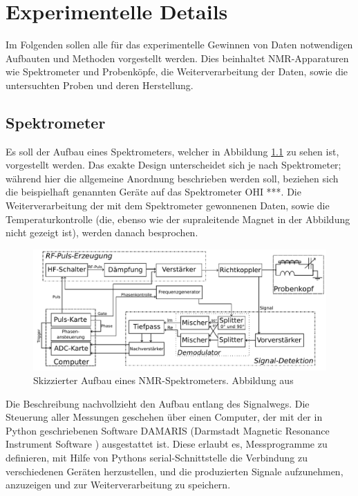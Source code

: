 \chapter{Experimentelle Details} \label{chapter:exp_details}

Im Folgenden sollen alle für das experimentelle Gewinnen von Daten notwendigen Aufbauten und Methoden vorgestellt werden. Dies beinhaltet NMR-Apparaturen wie Spektrometer und Probenköpfe, die Weiterverarbeitung der Daten, sowie die untersuchten Proben und deren Herstellung.

\section{Spektrometer} \label{section:exp:spektrometer}

Es soll der Aufbau eines Spektrometers, welcher in Abbildung \ref{fig:exp:aufbau} zu sehen ist, vorgestellt werden. Das exakte Design unterscheidet sich je nach Spektrometer; während hier die allgemeine Anordnung beschrieben werden soll, beziehen sich die beispielhaft genannten Geräte auf das Spektrometer OHI ***. Die Weiterverarbeitung der mit dem Spektrometer gewonnenen Daten, sowie die Temperaturkontrolle (die, ebenso wie der supraleitende Magnet in der Abbildung nicht gezeigt ist), werden danach besprochen.

\begin{figure}
	\begin{center}
		\includegraphics[width=\textwidth]{graphics/joachim/aufbau.pdf} 
	\end{center}
	\caption{Skizzierter Aufbau eines NMR-Spektrometers. Abbildung aus \cite[S. 29]{lueg_implementierung_2016}} \label{fig:exp:aufbau}
\end{figure}

Die Beschreibung nachvollzieht den Aufbau entlang des Signalwegs. Die Steuerung aller Messungen geschehen über einen Computer, der mit der in Python geschriebenen Software DAMARIS (Darmstadt Magnetic Resonance Instrument Software \cite{gadke_damaris_2007}) ausgestattet ist. Diese erlaubt es, Messprogramme zu definieren, mit Hilfe von Pythons serial-Schnittstelle die Verbindung zu verschiedenen Geräten herzustellen, und die produzierten Signale aufzunehmen, anzuzeigen und zur Weiterverarbeitung zu speichern.


